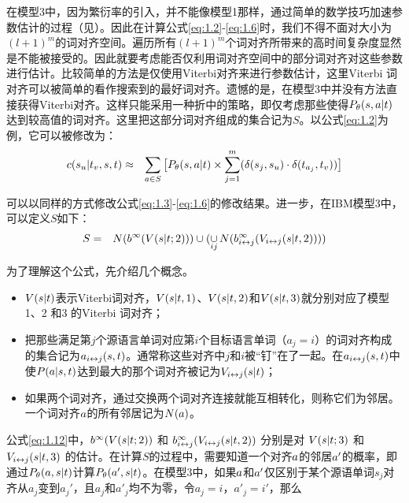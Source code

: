 \begin{appendices}
\parinterval 在模型3中，因为繁衍率的引入，并不能像模型1那样，通过简单的数学技巧加速参数估计的过程（见{\chapterfive}）。因此在计算公式\eqref{eq:1.2}-\eqref{eq:1.6}时，我们不得不面对大小为$(l+1)^m$的词对齐空间。遍历所有$(l+1)^m$个词对齐所带来的高时间复杂度显然是不能被接受的。因此就要考虑能否仅利用词对齐空间中的部分词对齐对这些参数进行估计。比较简单的方法是仅使用Viterbi对齐来进行参数估计，这里Viterbi 词对齐可以被简单的看作搜索到的最好词对齐。遗憾的是，在模型3中并没有方法直接获得Viterbi对齐。这样只能采用一种折中的策略，即仅考虑那些使得${P}_{\theta}({s},{a}|{t})$ 达到较高值的词对齐。这里把这部分词对齐组成的集合记为$S$。以公式\eqref{eq:1.2}为例，它可以被修改为：
\begin{eqnarray}
c(s_u|t_v,{s},{t}) &\approx & \sum_{{a} \in S}\big[{P}_{\theta}({s},{a}|{t}) \times \sum_{j=1}^{m}(\delta(s_j,s_u) \cdot \delta(t_{a_{j}},t_v)) \big]
\label{eq:1.11}
\end{eqnarray}

\parinterval 可以以同样的方式修改公式\eqref{eq:1.3}-\eqref{eq:1.6}的修改结果。进一步，在IBM模型3中，可以定义$S$如下：
\begin{eqnarray}
S &=& N(b^{\infty}(V({s}|{t};2))) \cup (\mathop{\cup}\limits_{ij} N(b_{i \leftrightarrow j}^{\infty}(V_{i \leftrightarrow j}({s}|{t},2))))
\label{eq:1.12}
\end{eqnarray}

\parinterval 为了理解这个公式，先介绍几个概念。
\begin{itemize}
\item $V({s}|{t})$表示Viterbi词对齐，$V({s}|{t},1)$、$V({s}|{t},2)$和$V({s}|{t},3)$就分别对应了模型1、2 和3 的Viterbi 词对齐；
\item 把那些满足第$j$个源语言单词对应第$i$个目标语言单词（$a_j=i$）的词对齐构成的集合记为${a}_{i \leftrightarrow j}({s},{t})$。通常称这些对齐中$j$和$i$被``钉''在了一起。在${a}_{i \leftrightarrow j}({s},{t})$中使${P}({a}|{s},{t})$达到最大的那个词对齐被记为$V_{i \leftrightarrow j}({s}|{t})$；
\item 如果两个词对齐，通过交换两个词对齐连接就能互相转化，则称它们为邻居。一个词对齐${a}$的所有邻居记为$N({a})$。
\end{itemize}

\vspace{0.5em}
\parinterval 公式\eqref{eq:1.12}中，$b^{\infty}(V({s}|{t};2))$ 和 $b_{i \leftrightarrow j}^{\infty}(V_{i \leftrightarrow j}({s}|{t},2))$ 分别是对 $V({s}|{t};3)$ 和 $V_{i \leftrightarrow j}({s}|{t},3)$ 的估计。在计算$S$的过程中，需要知道一个对齐${a}$的邻居${a}'$的概率，即通过${P}_{\theta}({a},{s}|{t})$计算${P}_{\theta}({a}',{s}|{t})$。在模型3中，如果${a}$和${a}'$仅区别于某个源语单词$s_j$对齐从$a_j$变到$a_{j}'$，且$a_j$和$a'_j$均不为零，令$a_j=i$，$a'_{j}=i'$，那么


\end{appendices}
